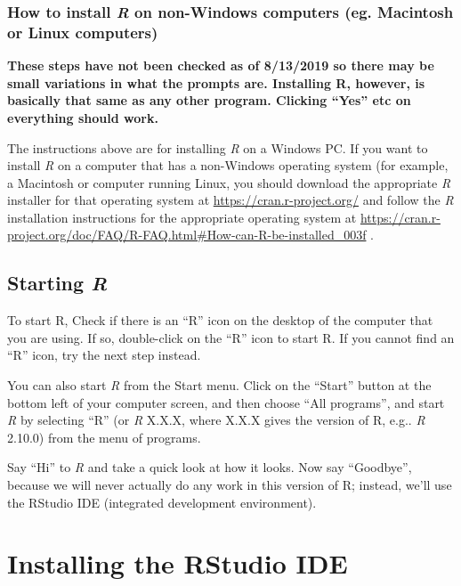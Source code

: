 \documentclass[
]{book}
\begin{document}
\hypertarget{how-to-install-r-on-non-windows-computers-eg.-macintosh-or-linux-computers}{%
\subsection{\texorpdfstring{How to install \emph{R} on non-Windows computers (eg. Macintosh or Linux computers)}{How to install R on non-Windows computers (eg. Macintosh or Linux computers)}}\label{how-to-install-r-on-non-windows-computers-eg.-macintosh-or-linux-computers}}

\textbf{These steps have not been checked as of 8/13/2019 so there may be small variations in what the prompts are. Installing R, however, is basically that same as any other program. Clicking ``Yes'' etc on everything should work.}

The instructions above are for installing \emph{R} on a Windows PC. If you want to install \emph{R} on a computer that has a non-Windows operating system (for example, a Macintosh or computer running Linux, you should download the appropriate \emph{R} installer for that operating system at \url{https://cran.r-project.org/} and follow the \emph{R} installation instructions for the appropriate operating system at \url{https://cran.r-project.org/doc/FAQ/R-FAQ.html\#How-can-R-be-installed_003f} .

\hypertarget{starting-r}{%
\section{\texorpdfstring{Starting \emph{R}}{Starting R}}\label{starting-r}}

To start R, Check if there is an ``R'' icon on the desktop of the computer that you are using. If so, double-click on the ``R'' icon to start R. If you cannot find an ``R'' icon, try the next step instead.

You can also start \emph{R} from the Start menu. Click on the ``Start'' button at the bottom left of your computer screen, and then choose ``All programs'', and start \emph{R} by selecting ``R'' (or \emph{R} X.X.X, where X.X.X gives the version of R, e.g.. \emph{R} 2.10.0) from the menu of programs.

Say ``Hi'' to \emph{R} and take a quick look at how it looks. Now say ``Goodbye'', because we will never actually do any work in this version of R; instead, we'll use the RStudio IDE (integrated development environment).

\hypertarget{installing-the-rstudio-ide}{%
\chapter{Installing the RStudio IDE}\label{installing-the-rstudio-ide}}
\end{document}
